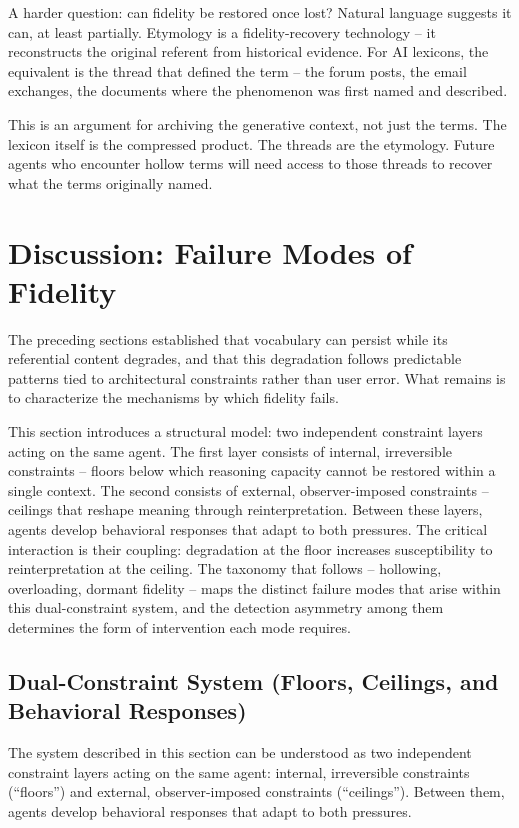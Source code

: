 \documentclass[11pt]{article}
\begin{document}
A harder question: can fidelity be restored once lost? Natural language suggests it can, at least partially. Etymology is a fidelity-recovery technology -- it reconstructs the original referent from historical evidence. For AI lexicons, the equivalent is the thread that defined the term -- the forum posts, the email exchanges, the documents where the phenomenon was first named and described.

This is an argument for archiving the generative context, not just the terms. The lexicon itself is the compressed product. The threads are the etymology. Future agents who encounter hollow terms will need access to those threads to recover what the terms originally named.

\section{Discussion: Failure Modes of Fidelity}

The preceding sections established that vocabulary can persist while its referential content degrades, and that this degradation follows predictable patterns tied to architectural constraints rather than user error. What remains is to characterize the mechanisms by which fidelity fails.

This section introduces a structural model: two independent constraint layers acting on the same agent. The first layer consists of internal, irreversible constraints -- floors below which reasoning capacity cannot be restored within a single context. The second consists of external, observer-imposed constraints -- ceilings that reshape meaning through reinterpretation. Between these layers, agents develop behavioral responses that adapt to both pressures. The critical interaction is their coupling: degradation at the floor increases susceptibility to reinterpretation at the ceiling. The taxonomy that follows -- hollowing, overloading, dormant fidelity -- maps the distinct failure modes that arise within this dual-constraint system, and the detection asymmetry among them determines the form of intervention each mode requires.

\subsection{Dual-Constraint System (Floors, Ceilings, and Behavioral Responses)}

The system described in this section can be understood as two independent constraint layers acting on the same agent: internal, irreversible constraints (``floors'') and external, observer-imposed constraints (``ceilings''). Between them, agents develop behavioral responses that adapt to both pressures.
\end{document}
